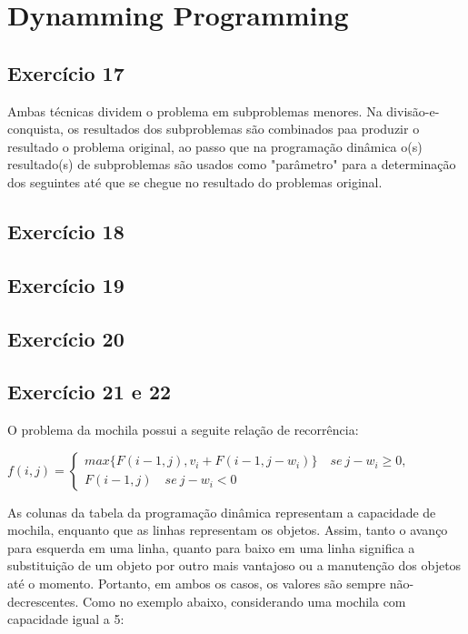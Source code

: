 \section{Dynamming Programming}\label{sec:dynamic_programming}

\subsection{Exercício 17}\label{sec:exer17}
Ambas técnicas dividem o problema em subproblemas menores. Na divisão-e-conquista,
os resultados dos subproblemas são combinados paa produzir o resultado o problema
original, ao passo que na programação dinâmica o(s) resultado(s) de subproblemas
são usados como "parâmetro" para a determinação dos seguintes até que se chegue
no resultado do problemas original.

\subsection{Exercício 18}\label{sec:exer18}



\subsection{Exercício 19}\label{sec:exer19}



\subsection{Exercício 20}\label{sec:exer20}



\subsection{Exercício 21 e 22}\label{sec:exer21}
O problema da mochila possui a seguite relação de recorrência:

$
f(i, j) =
\begin{cases} 
max \{F(i-1, j), v_i+F(i-1, j-w_i)\} \quad se\ j-w_i \ge 0,\\
F(i-1, j) \quad se\ j-w_i < 0
\end{cases}
$

As colunas da tabela da programação dinâmica representam a capacidade de mochila,
enquanto que as linhas representam os objetos. Assim, tanto o avanço para esquerda
em uma linha, quanto para baixo em uma linha significa a substituição de um objeto
por outro mais vantajoso ou a manutenção dos objetos até o momento. Portanto, em
ambos os casos, os valores são sempre não-decrescentes. Como no exemplo abaixo,
considerando uma mochila com capacidade igual a 5:

